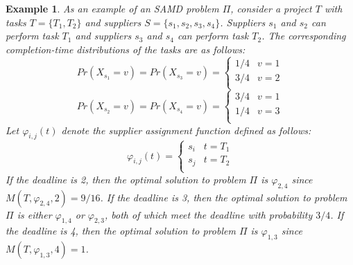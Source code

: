 \documentclass[letterpaper]{article} %
\newtheorem{example}{Example}
\newcommand{\samd}{\ac{SAMD}\xspace}
\begin{document}
\begin{example} 
As an example of an \samd problem $\Pi$, consider a project $T$ with tasks $T=\{T_1, T_2\}$ and suppliers $S=\{s_1, s_2, s_3, s_4\}$. 
Suppliers $s_1$ and $s_2$ can perform task $T_1$ 
and suppliers $s_3$ and $s_4$ can perform task $T_2$. 
The corresponding completion-time distributions of the tasks are as follows:
\[ Pr(X_{s_1}=v)=Pr(X_{s_3}=v)=
\begin{cases}
      1/4 & v=1\\
      3/4 & v=2\\
\end{cases}
\]
\[ Pr(X_{s_2}=v)=Pr(X_{s_4}=v)=
\begin{cases}
      3/4 & v=1\\
      1/4 & v=3\\
\end{cases}
\]
Let $\varphi_{i,j}(t)$ denote the supplier assignment function defined as follows:
\[\varphi_{i,j}(t)=
\begin{cases}
      s_i & t=T_1\\
      s_j & t=T_2\\
\end{cases}\]
If the deadline is 2, then the optimal solution to problem $\Pi$ is $\varphi_{2,4}$ 
since $M(T, \varphi_{2,4}, 2)=9/16$.
If the deadline is 3, then the optimal solution to problem $\Pi$ is either $\varphi_{1,4}$ 
or $\varphi_{2,3}$, both of which meet the deadline with probability $3/4$. If the deadline is 4, then the optimal solution to problem $\Pi$ is $\varphi_{1,3}$  since $M(T, \varphi_{1,3}, 4)=1$. 
\end{example}




\end{document}

